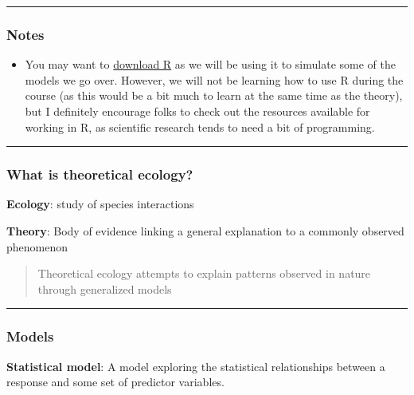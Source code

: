 \documentclass[
]{article}
\providecommand{\tightlist}{%
  \setlength{\itemsep}{0pt}\setlength{\parskip}{0pt}}
\begin{document}
\begin{center}\rule{0.5\linewidth}{0.5pt}\end{center}

\hypertarget{notes}{%
\subsubsection{Notes}\label{notes}}

\begin{itemize}
\tightlist
\item
  You may want to \href{https://www.r-project.org/}{download R} as we
  will be using it to simulate some of the models we go over. However,
  we will not be learning how to use R during the course (as this would
  be a bit much to learn at the same time as the theory), but I
  definitely encourage folks to check out the resources available for
  working in R, as scientific research tends to need a bit of
  programming.
\end{itemize}

\begin{center}\rule{0.5\linewidth}{0.5pt}\end{center}

\hypertarget{what-is-theoretical-ecology}{%
\subsubsection{What is theoretical
ecology?}\label{what-is-theoretical-ecology}}

\textbf{Ecology}: study of species interactions

\textbf{Theory}: Body of evidence linking a general explanation to a
commonly observed phenomenon

\begin{quote}
Theoretical ecology attempts to explain patterns observed in nature
through generalized models
\end{quote}

\begin{center}\rule{0.5\linewidth}{0.5pt}\end{center}

\hypertarget{models}{%
\subsubsection{Models}\label{models}}

\textbf{Statistical model}: A model exploring the statistical
relationships between a response and some set of predictor variables.
\end{document}
